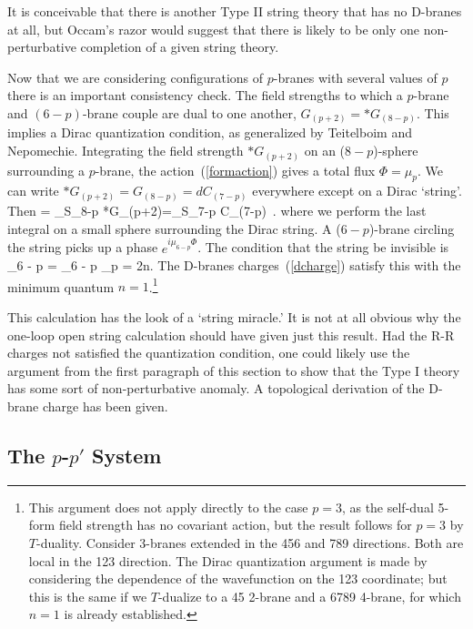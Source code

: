 It is conceivable that there is another Type II string theory that has no
D-branes at all, but Occam's razor would suggest that there is likely to be
only one non-perturbative completion of a given string theory.

Now that we are considering configurations of $p$-branes with several values
of $p$ there is an important consistency check.  The field strengths to
which a $p$-brane and $(6 - p)$-brane couple are dual to one another,
$G_{(p+2)} = *G_{(8-p)}$.  This implies a Dirac quantization condition, as
generalized by Teitelboim and Nepomechie.\cite{dirac}  Integrating the field
strength $*G_{(p+2)}$ on an ($8 - p$)-sphere surrounding a $p$-brane,
the action~(\ref{formaction}) gives a total flux $\Phi=
\mu_p$.  We can write
$*G_{(p+2)} = G_{(8-p)} = d C_{(7-p)}$ everywhere except on a Dirac
`string'.  Then
\be
\Phi= \int_{S_{8-p}} *G_{(p+2)}=\int_{S_{7-p}} C_{(7-p)}\ .
\ee
where we perform the last integral on a small sphere surrounding the Dirac 
string.  A ($6 - p$)-brane circling the string picks up a phase
$e^{i \mu_{6 - p}\Phi}$.  The condition that the string be invisible is
\be
\mu_{6 - p} \Phi = \mu_{6 - p} \mu_p = 2\pi n.
\ee
The D-branes charges~(\ref{dcharge}) satisfy this with the minimum
quantum $n=1$.\footnote
{This argument does not apply directly to the case $p=3$, as the self-dual
5-form field strength has no covariant action, but the result follows for
$p = 3$ by $T$-duality.  Consider 3-branes extended in the 456 and 789
directions.  Both are local in the 123 direction.  The Dirac quantization
argument is made by considering the dependence of the wavefunction on the 123
coordinate; but this is the same if we $T$-dualize to a 45 2-brane and a
6789 4-brane, for which $n=1$ is already established.}

This calculation has the look of a `string miracle.'  It is not at all
obvious why the one-loop open string calculation should have given just this
result.  Had the R-R charges not satisfied the quantization condition, one
could likely use the argument from the first paragraph of this section to
show that the Type I theory has some sort of non-perturbative anomaly. 
A topological derivation of the D-brane charge has been given.\cite{ghs}

\subsection{The $p$-$p'$ System}

